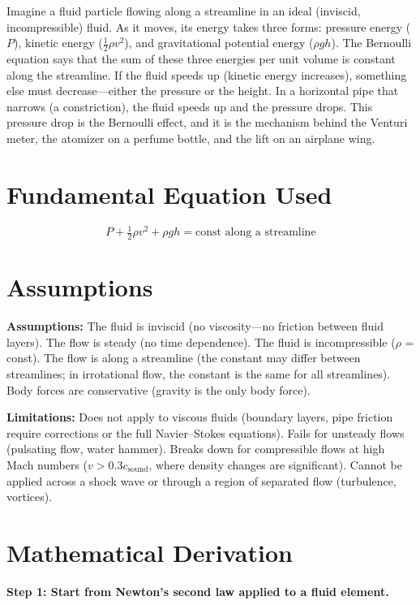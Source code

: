 \documentclass[11pt,openright]{book}
\begin{document}
Imagine a fluid particle flowing along a streamline in an ideal (inviscid, incompressible) fluid. As it moves, its energy takes three forms: pressure energy ($P$), kinetic energy ($\frac{1}{2}\rho v^2$), and gravitational potential energy ($\rho gh$). The Bernoulli equation says that the sum of these three energies per unit volume is constant along the streamline. If the fluid speeds up (kinetic energy increases), something else must decrease---either the pressure or the height. In a horizontal pipe that narrows (a constriction), the fluid speeds up and the pressure drops. This pressure drop is the Bernoulli effect, and it is the mechanism behind the Venturi meter, the atomizer on a perfume bottle, and the lift on an airplane wing.
\section*{Fundamental Equation Used}

\begin{equation}
P + \tfrac{1}{2}\rho v^2 + \rho gh = \text{const along a streamline}
\end{equation}
\section*{Assumptions}

\textbf{Assumptions:} The fluid is inviscid (no viscosity---no friction between fluid layers). The flow is steady (no time dependence). The fluid is incompressible ($\rho$ = const). The flow is along a streamline (the constant may differ between streamlines; in irrotational flow, the constant is the same for all streamlines). Body forces are conservative (gravity is the only body force).


\textbf{Limitations:} Does not apply to viscous fluids (boundary layers, pipe friction require corrections or the full Navier--Stokes equations). Fails for unsteady flows (pulsating flow, water hammer). Breaks down for compressible flows at high Mach numbers ($v > 0.3c_{\text{sound}}$, where density changes are significant). Cannot be applied across a shock wave or through a region of separated flow (turbulence, vortices).


\section*{Mathematical Derivation}

\textbf{Step 1: Start from Newton's second law applied to a fluid element.}
\end{document}
